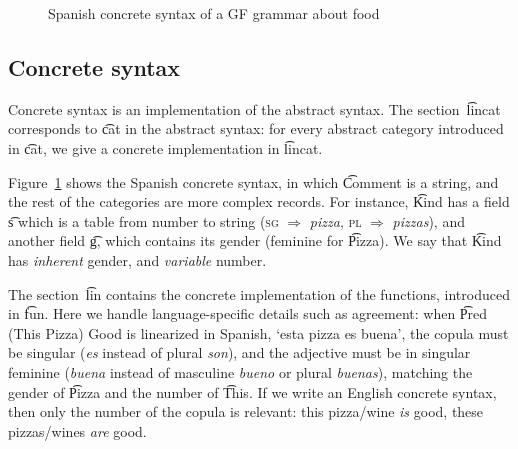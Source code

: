 \begin{figure}[h]
\begin{Shaded}
\begin{Highlighting}[]
  \FunctionTok{=}
      \FunctionTok{=}   \NormalTok{\{ } \OtherTok{=>}  \OtherTok{=>} 
       \FunctionTok{=} \FunctionTok{++} \FunctionTok{!}  \NormalTok{;} \FunctionTok{=}  \FunctionTok{=} 
    \FunctionTok{=}  \OtherTok{=>}  \NormalTok{; } \OtherTok{=>}  \NormalTok{\} ;}
    \FunctionTok{=}   \NormalTok{\{ } \OtherTok{=>} \FunctionTok{++}  \OtherTok{=>} \FunctionTok{++} 
\end{Highlighting}
\end{Shaded}
  \caption{Spanish concrete syntax of a GF grammar about food}
\label{fig:spanish}
\end{figure}

\subsection{Concrete syntax}
\label{concrete_spanish_foods}
Concrete syntax is an implementation of the abstract syntax.
The section~\t{lincat} corresponds to \t{cat} in the abstract syntax:
for every abstract category introduced in \t{cat}, we give a concrete
implementation in \t{lincat}.


Figure~\ref{fig:spanish} shows the Spanish concrete
syntax, in which \t{Comment} is a string, and the rest of the
categories are more complex records. For instance, \t{Kind} has a
field \t{s} which is a table from number to string (\textsc{sg} $\Rightarrow$
\emph{pizza}, \textsc{pl} $\Rightarrow$ \emph{pizzas}), and another
field \t{g}, which contains its gender (feminine for \t{Pizza}). We
say that \t{Kind} has \emph{inherent} gender, and \emph{variable} number. 

The section~\t{lin} contains the concrete implementation of the
functions, introduced in \t{fun}. Here we handle
language-specific details such as agreement: when \t{Pred (This Pizza)
  Good} is linearized in Spanish, `esta pizza es buena', the copula must be singular
(\emph{es} instead of plural \emph{son}), and the adjective must be in singular
feminine (\emph{buena} instead of masculine \emph{bueno} or plural
\emph{buenas}), matching the gender of \t{Pizza} and the number of \t{This}. 
If we write an English concrete syntax, then only the number of the copula is
relevant: this pizza/wine \emph{is} good, these pizzas/wines \emph{are} good.


